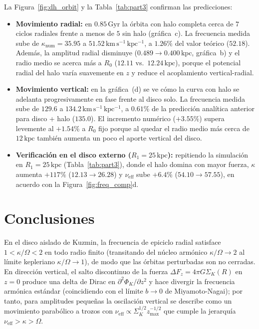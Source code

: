 \documentclass[11pt,letterpaper]{article}
\begin{document}
La Figura~\ref{fig:dh_orbit} y la Tabla~\ref{tab:part3} confirman las predicciones:
\begin{itemize}
    \item \textbf{Movimiento radial:} en $0.85\,\mathrm{Gyr}$ la órbita con halo completa cerca de $7$ ciclos radiales frente a menos de $5$ sin halo (gráfica~c). La frecuencia medida sube de $\kappa_{\mathrm{num}} = 35.95$ a $51.52\,\mathrm{km\,s^{-1}\,kpc^{-1}}$, a $1.26\%$ del valor teórico ($52.18$). Además, la amplitud radial disminuye ($0.489 \to 0.400\,\mathrm{kpc}$, gráfica~b) y el radio medio se acerca más a $R_0$ ($12.11$ vs.\ $12.24\,\mathrm{kpc}$), porque el potencial radial del halo varía suavemente en $z$ y reduce el acoplamiento vertical-radial.
    \item \textbf{Movimiento vertical:} en la gráfica~(d) se ve cómo la curva con halo se adelanta progresivamente en fase frente al disco solo. La frecuencia medida sube de $129.6$ a $134.2\,\mathrm{km\,s^{-1}\,kpc^{-1}}$, a $0.61\%$ de la predicción analítica anterior para disco + halo ($135.0$). El incremento numérico ($+3.55\%$) supera levemente al $+1.54\%$ a $R_0$ fijo porque al quedar el radio medio más cerca de $12\,\mathrm{kpc}$ también aumenta un poco el aporte vertical del disco.
    \item \textbf{Verificación en el disco externo ($R_1 = 25\,\mathrm{kpc}$):} repitiendo la simulación en $R_1 = 25\,\mathrm{kpc}$ (Tabla~\ref{tab:part3}), donde el halo domina con mayor fuerza, $\kappa$ aumenta $+117\%$ ($12.13 \to 26.28$) y $\nu_{\mathrm{eff}}$ sube $+6.4\%$ ($54.10 \to 57.55$), en acuerdo con la Figura~\ref{fig:freq_comp}d.
\end{itemize}

\section*{Conclusiones}

En el disco aislado de Kuzmin, la frecuencia de epiciclo radial satisface $1 < \kappa/\Omega < 2$ en todo radio finito (transitando del núcleo armónico $\kappa/\Omega \to 2$ al límite kepleriano $\kappa/\Omega \to 1$), de modo que las órbitas perturbadas son no cerradas. En dirección vertical, el salto discontinuo de la fuerza $\Delta F_z = 4\pi G\Sigma_K(R)$ en $z = 0$ produce una delta de Dirac en $\partial^2\Phi_K/\partial z^2$ y hace divergir la frecuencia armónica estándar (coincidiendo con el límite $b \to 0$ de Miyamoto-Nagai); por tanto, para amplitudes pequeñas la oscilación vertical se describe como un movimiento parabólico a trozos con $\nu_{\mathrm{eff}} \propto \Sigma_K^{1/2} z_{\max}^{-1/2}$ que cumple la jerarquía $\nu_{\mathrm{eff}} > \kappa > \Omega$.
\end{document}
